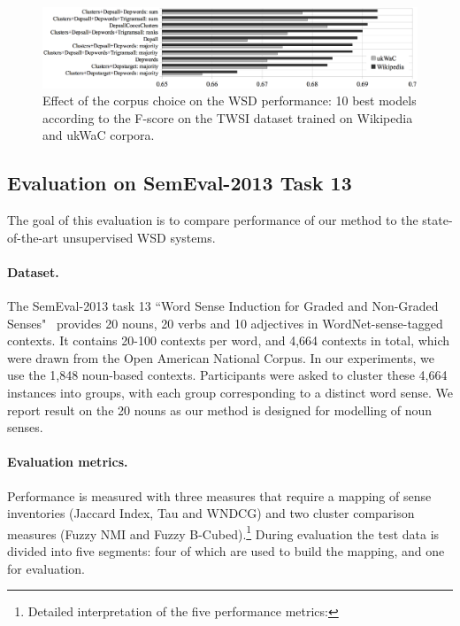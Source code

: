 \documentclass[11pt]{article}
\begin{document}
\begin{figure}
\begin{center}
\includegraphics[width=1.0\textwidth]{figures/ukwac-wiki-4}
\end{center}
\caption{Effect of the corpus choice on the WSD performance: 10 best models according to the F-score on the TWSI dataset trained on Wikipedia and ukWaC corpora. }
\label{fig:wiki-vs-ukwac}
\end{figure}

\subsection{Evaluation on SemEval-2013 Task 13}

The goal of this evaluation is to compare performance of our method to the state-of-the-art unsupervised WSD systems.


\paragraph{Dataset.}  


The SemEval-2013 task 13 ``Word Sense Induction for Graded and Non-Graded Senses"~\cite{Jurgens2013} provides 20 nouns, 20 verbs and 10 adjectives in WordNet-sense-tagged contexts. It contains 20-100 contexts per word, and 4,664 contexts in total, which were drawn from the Open American National Corpus. In our experiments, we use the 1,848 noun-based contexts. Participants were asked to cluster these 4,664 instances into groups, with each group corresponding to a distinct word sense. We report result on the 20 nouns as our method is designed for modelling of noun senses.

\paragraph{Evaluation metrics.}  Performance is measured with three measures  that require a mapping of sense inventories (Jaccard Index, Tau and WNDCG) and two cluster comparison measures (Fuzzy NMI and  Fuzzy B-Cubed).\footnote{Detailed interpretation of the five performance metrics: \myurl} During evaluation the test data is divided into five segments: four of which are used to build the mapping, and one for evaluation. 
\end{document}
